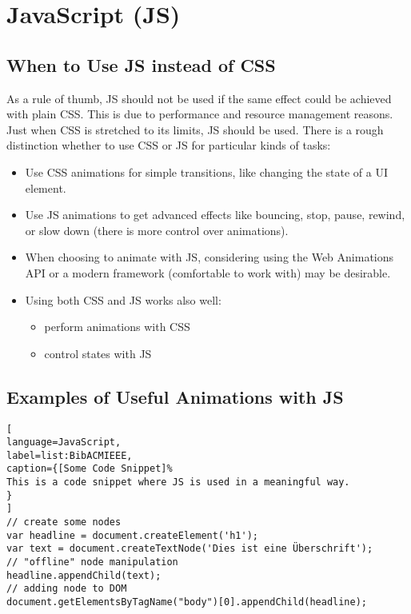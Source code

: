 %
%
% 
% 
% 


\chapter{JavaScript (JS)}

\label{chap:JS}

\section{When to Use JS instead of CSS}

As a rule of thumb, JS should not be used if the same effect could be achieved with plain CSS. This is due to performance and resource management reasons. Just when CSS is stretched to its limits, JS should be used. There is a rough distinction whether to use CSS or JS for particular kinds of tasks:
\begin{itemize}
	\item Use CSS animations for simple transitions, like changing the state of a UI element.
	\item Use JS animations to get advanced effects like bouncing, stop, pause, rewind, or slow down (there is more control over animations).
	\item When choosing to animate with JS, considering using the Web Animations API or a modern framework (comfortable to work with) may be desirable.
	\item Using both CSS and JS works also well:
	\begin{itemize}
		\item perform animations with CSS
		\item control states with JS
	\end{itemize}
\end{itemize}


\section{Examples of Useful Animations with JS}



\begin{lstlisting}[
language=JavaScript,
label=list:BibACMIEEE,
caption={[Some Code Snippet]%
This is a code snippet where JS is used in a meaningful way.
}
]
// create some nodes
var headline = document.createElement('h1');
var text = document.createTextNode('Dies ist eine Überschrift');
// "offline" node manipulation
headline.appendChild(text);
// adding node to DOM
document.getElementsByTagName("body")[0].appendChild(headline);
\end{lstlisting}